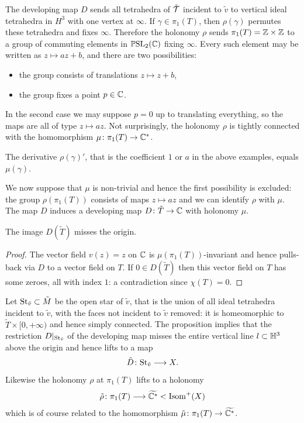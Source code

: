 The developing map $D$ sends all tetrahedra of $\tilde{\mathcal{T}}$ incident to $\tilde v$ to vertical ideal tetrahedra in $H^3$ with one vertex at $\infty$. If $\gamma \in \pi_1(T)$, then $\rho(\gamma)$ permutes these tetrahedra and fixes $\infty$. Therefore the holonomy $\rho$ sends $\pi_1(T)=\mathbb{Z}\times \mathbb{Z}$ to a group of commuting elements in $\mathbb{P}{\rm SL}_2(\mathbb{C})$ fixing $\infty$. Every such element may be written as $z\mapsto az+b$, and there are two possibilities:
\begin{itemize}
\item the group consists of translations $z \mapsto z+b$,
\item the group fixes a point $p\in\mathbb{C}$.
\end{itemize}
In the second case we may suppose $p=0$ up to translating everything, so the maps are all of type $z\mapsto az$. Not surprisingly, the holonomy $\rho$ is tightly connected with the homomorphism $\mu\colon \pi_1(T) \to \mathbb{C}^*$.
\begin{ex} \label{rho:derivative:ex}
The derivative $\rho(\gamma)'$, that is the coefficient $1$ or $a$ in the above examples, equals $\mu(\gamma)$. 
\end{ex}
We now suppose that $\mu$ is non-trivial and hence the first possibility is excluded: the group $\rho(\pi_1(T))$ consists of maps $z\mapsto az$ and we can identify $\rho$ with $\mu$. The map $D$ induces a developing map $D\colon \tilde T \to \mathbb{C}$ with holonomy $\mu$.

\begin{prop}
The image $D(\tilde T)$ misses the origin.
\end{prop}
\begin{proof}
The vector field $v(z) = z$ on $\mathbb{C}$ is $\mu(\pi_1(T))$-invariant and hence pulls-back via $D$ to a vector field on $T$. If $0\in D(\tilde T)$ then this vector field on $T$ has some zeroes, all with index $1$: a contradiction since $\chi(T)=0$.
\end{proof}

Let ${\rm St}_{\tilde v}\subset \tilde M$ be the open star of $\tilde v$, that is the union of all ideal tetrahedra incident to $\tilde v$, with the faces not incident to $\tilde v$ removed: it is homeomorphic to $\tilde T\times [0,+\infty)$ and hence simply connected. The proposition implies that the restriction $D|_{{\rm St}_{\tilde v}}$ of
the developing map misses the entire vertical line $l\subset \mathbb{H}^3$ above the origin and hence lifts to a map 
$$\tilde {D} \colon {\rm St}_{\tilde v} \longrightarrow X.$$ 
Likewise the holonomy $\rho$ at $\pi_1(T)$ lifts to a holonomy 
$$\tilde \rho \colon \pi_1(T) \longrightarrow \widetilde{\mathbb{C}^*} < {\rm Isom}^+(X)$$
which is of course related to the homomorphism $\tilde \mu\colon \pi_1(T) \to \widetilde{\mathbb{C}^*}$.

